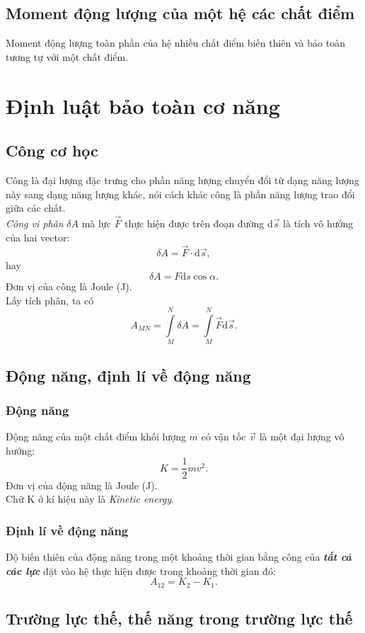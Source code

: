 \subsection{Moment động lượng của một hệ các chất điểm}
Moment động lượng toàn phần của hệ nhiều chất điểm biến thiên và bảo toàn tương tự với một chất điểm.
\section{Định luật bảo toàn cơ năng}
\subsection{Công cơ học}
Công là đại lượng đặc trưng cho phần năng lượng chuyển đổi từ dạng năng lượng này sang dạng năng lượng khác, nói cách khác công là phần năng lượng trao đổi giữa các chất.\\
\textit{Công vi phân} $\delta A$ mà lực $\overrightarrow{F}$ thực hiện được trên đoạn đường $\mathrm{d}\overrightarrow{s}$ là tích vô hướng của hai vector:
$$\delta A = \overrightarrow{F} \cdot \mathrm{d}\overrightarrow{s},$$
hay
$$\delta A = F \mathrm{d}s \cos \alpha.$$
Đơn vị của công là Joule (J). \\
Lấy tích phân, ta có
$${A_{MN}} = \int\limits_M^N {\delta A}  = \int\limits_M^N {\overrightarrow F \mathrm{d}\overrightarrow s } .$$
\subsection{Động năng, định lí về động năng}
\subsubsection{Động năng}
Động năng của một chất điểm khối lượng $m$ có vận tốc $\overrightarrow{v}$ là một đại lượng vô hướng:
$$K = \frac{1}{2}mv^2.$$
Đơn vị của động năng là Joule (J).\\
Chữ K ở kí hiệu này là \textit{Kinetic energy}.
\subsubsection{Định lí về động năng}
Độ biến thiên của động năng trong một khoảng thời gian bằng công của \textit{\textbf{tất cả các lực}} đặt vào hệ thực hiện được trong khoảng thời gian đó:
$$A_{12} = K_2 - K_1.$$
\subsection{Trường lực thế, thế năng trong trường lực thế}
